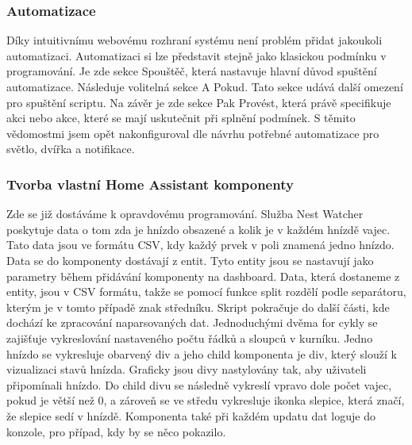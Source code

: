 \subsubsection*{Automatizace}
Díky intuitivnímu webovému rozhraní systému není problém přidat jakoukoli automatizaci.
Automatizaci si lze představit stejně jako klasickou podmínku v programování.
Je zde sekce Spouštěč, která nastavuje hlavní důvod spuštění automatizace.
Následuje volitelná sekce A Pokud.
Tato sekce udává další omezení pro spuštění scriptu.
Na závěr je zde sekce Pak Provést, která právě specifikuje akci nebo akce, které se mají uskutečnit při splnění podmínek.
S těmito vědomostmi jsem opět nakonfiguroval dle návrhu potřebné automatizace pro světlo, dvířka a notifikace.


\subsubsection*{Tvorba vlastní Home Assistant komponenty}
Zde se již dostáváme k opravdovému programování.
Služba Nest Watcher poskytuje data o tom zda je hnízdo obsazené a kolik je v každém hnízdě vajec.
Tato data jsou ve formátu CSV, kdy každý prvek v poli znamená jedno hnízdo.
Data se do komponenty dostávají z entit.
Tyto entity jsou se nastavují jako parametry během přidávání komponenty na dashboard.
Data, která dostaneme z entity, jsou v CSV formátu, takže se pomocí funkce split rozdělí podle separátoru, kterým je v tomto případě znak středníku.
Skript pokračuje do další části, kde dochází ke zpracování naparsovaných dat.
Jednoduchými dvěma for cykly se zajišťuje vykreslování nastaveného počtu řádků a sloupců v kurníku.
Jedno hnízdo se vykresluje obarvený div a jeho child komponenta je div, který slouží k vizualizaci stavů hnízda.
Graficky jsou divy nastylovány tak, aby uživateli připomínali hnízdo.
Do child divu se následně vykreslí vpravo dole počet vajec, pokud je větší než 0, a zároveň se ve středu vykresluje ikonka slepice, která značí, že slepice sedí v hnízdě.
Komponenta také při každém updatu dat loguje do konzole, pro případ, kdy by se něco pokazilo.




